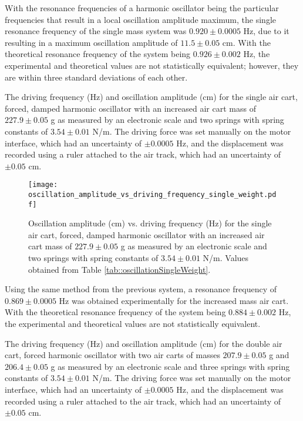 With the resonance frequencies of a harmonic oscillator being the particular frequencies that result in a local oscillation amplitude maximum, the single resonance frequency of the single mass system was $0.920 \pm 0.0005$ Hz, due to it resulting in a maximum oscillation amplitude of $11.5 \pm 0.05$ cm. With the theoretical resonance frequency of the system being $0.926 \pm 0.002$ Hz, the experimental and theoretical values are not statistically equivalent; however, they are within three standard deviations of each other.

\begin{table}[H]
	\centering
	
	\caption{The driving frequency (Hz) and oscillation amplitude (cm) for the single air cart, forced, damped harmonic oscillator with an increased air cart mass of $227.9 \pm 0.05$ g as measured by an electronic scale and two springs with spring constants of $3.54 \pm 0.01$ N/m. The driving force was set manually on the motor interface, which had an uncertainty of $\pm 0.0005$ Hz, and the displacement was recorded using a ruler attached to the air track, which had an uncertainty of $\pm 0.05$ cm.}
	\label{tab::oscillationSingleWeight}
\end{table}

\begin{figure}[H]
    \centering
	\texttt{[image: oscillation\_amplitude\_vs\_driving\_frequency\_single\_weight.pdf]}
	\label{fig::resonanceSingleWeight}
	\caption{Oscillation amplitude (cm) vs. driving frequency (Hz) for the single air cart, forced, damped harmonic oscillator with an increased air cart mass of $227.9 \pm 0.05$ g as measured by an electronic scale and two springs with spring constants of $3.54 \pm 0.01$ N/m. Values obtained from Table \ref{tab::oscillationSingleWeight}.}
\end{figure}

Using the same method from the previous system, a resonance frequency of $0.869 \pm 0.0005$ Hz was obtained experimentally for the increased mass air cart. With the theoretical resonance frequency of the system being $0.884 \pm 0.002$ Hz, the experimental and theoretical values are not statistically equivalent.

\begin{table}[H]
	\centering
	
	\caption{The driving frequency (Hz) and oscillation amplitude (cm) for the double air cart, forced harmonic oscillator with two air carts of masses $207.9 \pm 0.05$ g and $206.4 \pm 0.05$ g as measured by an electronic scale and three springs with spring constants of $3.54 \pm 0.01$ N/m. The driving force was set manually on the motor interface, which had an uncertainty of $\pm 0.0005$ Hz, and the displacement was recorded using a ruler attached to the air track, which had an uncertainty of $\pm 0.05$ cm.}
	\label{tab::oscillationDouble}
\end{table}

